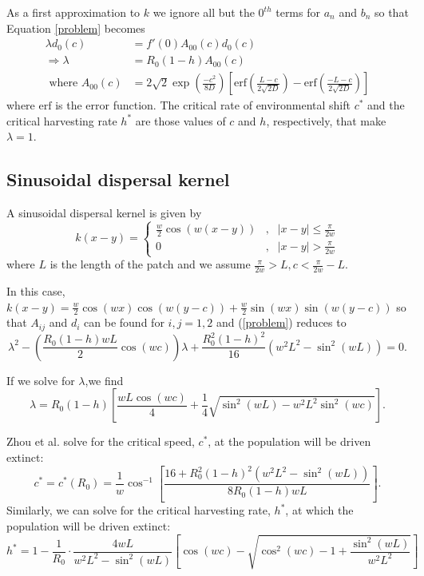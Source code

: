 \documentclass[]{article}
\begin{document}
As a first approximation to $k$ we ignore all but the $0^{th}$ terms for $a_n$ and $b_n$ so that Equation \ref{problem} becomes
\begin{align*}
\lambda d_0(c)&=f'(0)A_{00}(c)d_0(c)
\\ \Rightarrow \lambda&=R_0(1-h)A_{00}(c)
\\\text{ where } A_{00}(c)&=2\sqrt{2}\exp\left(\frac{-c^2}{8D}\right)\left[\text{erf}\left(\frac{L-c}{2\sqrt{2D}}\right)-\text{erf}\left(\frac{-L-c}{2\sqrt{2D}}\right)\right]
\end{align*}
where $\text{erf}$ is the error function.  The critical rate of environmental shift $c^*$ and the critical harvesting rate $h^*$ are those values of $c$ and $h$, respectively, that make $\lambda=1$.

\subsection{Sinusoidal dispersal kernel }
A sinusoidal dispersal kernel is given by 
$$k(x-y)=\left\{\begin{array}{ccccc}
\frac{w}{2}\cos(w(x-y)) & , & |x-y|\leq\frac{\pi}{2w}
\\ 0 & , & |x-y|>\frac{\pi}{2w}
\end{array}\right.
$$
where $L$ is the length of the patch and we assume $\frac{\pi}{2w}>L,c<\frac{\pi}{2w}-L$.

In this case, $k(x-y)=\frac{w}{2}\cos(wx)\cos(w(y-c))+\frac{w}{2}\sin(wx)\sin(w(y-c))$ so that $A_{ij}$ and $d_i$ can be found for $i,j=1,2$ and (\ref{problem}) reduces to 
$$\lambda^2-\left(\frac{R_0(1-h)wL}{2}\cos(wc)\right)\lambda+\frac{R_0^2(1-h)^2}{16}\left(w^2L^2-\sin^2(wL)\right)=0.$$

If we solve for $\lambda$,we find
\begin{equation} \lambda=R_0(1-h)\left[\frac{wL\cos(wc)}{4}+\frac{1}{4}\sqrt{\sin^2(wL)-w^2L^2\sin^2(wc)}\right]. \label{cosine} \end{equation}


Zhou et al. \citep{ZhouKot2011} solve for the critical speed, $c^*$, at the population will be driven extinct:
$$c^*=c^*(R_0)=\frac{1}{w}\cos^{-1}\left[\frac{16+R_0^2(1-h)^2(w^2L^2-\sin^2(wL))}{8R_0(1-h)wL}\right].$$
Similarly, we can solve for the critical harvesting rate, $h^*$, at which the population will be driven extinct:
$$
h^*=1-\frac{1}{R_0}\cdot\frac{4wL}{w^2L^2-\sin^2(wL)}\left[\cos(wc)-\sqrt{\cos^2(wc)-1+\frac{\sin^2(wL)}{w^2L^2}}\right] 
$$
\end{document}
